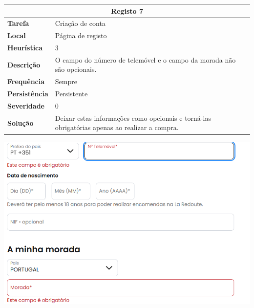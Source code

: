 \documentclass[a4paper,12pt]{article}
\begin{document}
\begin{center}
    \newpage
    \begin{table}[h!]
        \centering
        \begin{tabular}{|m{3cm}|m{12cm}|}
        \hline
        \multicolumn{2}{|c|}{\textbf{Registo 7}} \\ \hline
        \textbf{Tarefa}       & Criação de conta \\ \hline
        \textbf{Local}        & Página de registo \\ \hline
        \textbf{Heurística}   & 3  \\ \hline
        \textbf{Descrição}    & O campo do número de telemóvel e o campo da morada não são opcionais. \\ \hline
        \textbf{Frequência}   & Sempre \\ \hline
        \textbf{Persistência} & Persistente \\ \hline
        \textbf{Severidade}   & 0 \\ \hline
        \textbf{Solução}      & Deixar estas informações como opcionais e torná-las obrigatórias apenas ao realizar a compra. \\ \hline
        \end{tabular}
    \end{table}
    
    \vspace{0.5cm}
    \includegraphics[width=\textwidth, keepaspectratio]{heuristics/06telefone_registo.png}


\end{center}
\end{document}

